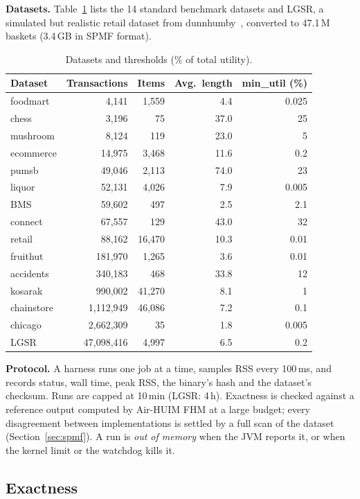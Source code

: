 \documentclass[conference]{IEEEtran}
\begin{document}
\textbf{Datasets.} Table~\ref{tab:data} lists the 14 standard benchmark datasets and LGSR, a
simulated but realistic retail dataset from dunnhumby~\cite{lgsr}, converted to 47.1\,M baskets
(3.4\,GB in SPMF format).

\begin{table}[t]
\centering
\caption{Datasets and thresholds (\% of total utility).}
\label{tab:data}
\footnotesize
\begin{tabular}{@{}lrrrr@{}}
\toprule
Dataset & Transactions & Items & Avg.\ length & min\_util (\%) \\
\midrule
foodmart & 4,141 & 1,559 & 4.4 & 0.025 \\
chess & 3,196 & 75 & 37.0 & 25 \\
mushroom & 8,124 & 119 & 23.0 & 5 \\
ecommerce & 14,975 & 3,468 & 11.6 & 0.2 \\
pumsb & 49,046 & 2,113 & 74.0 & 23 \\
liquor & 52,131 & 4,026 & 7.9 & 0.005 \\
BMS & 59,602 & 497 & 2.5 & 2.1 \\
connect & 67,557 & 129 & 43.0 & 32 \\
retail & 88,162 & 16,470 & 10.3 & 0.01 \\
fruithut & 181,970 & 1,265 & 3.6 & 0.01 \\
accidents & 340,183 & 468 & 33.8 & 12 \\
kosarak & 990,002 & 41,270 & 8.1 & 1 \\
chainstore & 1,112,949 & 46,086 & 7.2 & 0.1 \\
chicago & 2,662,309 & 35 & 1.8 & 0.005 \\
LGSR & 47,098,416 & 4,997 & 6.5 & 0.2 \\
\bottomrule
\end{tabular}
\end{table}

\textbf{Protocol.} A harness runs one job at a time, samples RSS every 100\,ms,
and records status, wall time, peak RSS, the binary's hash and the dataset's checksum. Runs are
capped at 10\,min (LGSR: 4\,h). Exactness is checked against a reference output computed by
Air-HUIM FHM at a large budget; every disagreement between implementations is settled by a full
scan of the dataset (Section~\ref{sec:spmf}). A run is \emph{out of memory} when the JVM reports
it, or when the kernel limit or the watchdog kills it.

\subsection{Exactness}
\end{document}

